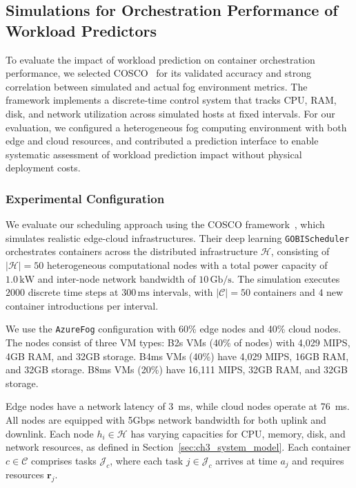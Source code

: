 \subsection{Simulations for Orchestration Performance of Workload Predictors}
\label{sec:ch3_simulations}


To evaluate the impact of workload prediction on container orchestration performance, we selected \ac{COSCO}~\cite{tuli2021cosco} for its validated accuracy and strong correlation between simulated and actual fog environment metrics. The framework implements a discrete-time control system that tracks \ac{CPU}, \ac{RAM}, disk, and network utilization across simulated hosts at fixed intervals. For our evaluation, we configured a heterogeneous fog computing environment with both edge and cloud resources, and contributed a prediction interface to enable systematic assessment of workload prediction impact without physical deployment costs.

\subsubsection{Experimental Configuration}

We evaluate our scheduling approach using the \ac{COSCO} framework~\cite{tuli2021cosco}, which simulates realistic edge-cloud infrastructures. Their deep learning \texttt{GOBIScheduler} orchestrates containers across the distributed infrastructure $\mathcal{H}$, consisting of $|\mathcal{H}| = 50$ heterogeneous computational nodes with a total power capacity of $1.0\,\text{kW}$ and inter-node network bandwidth of $10\,\text{Gb}/\text{s}$. The simulation executes $2000$ discrete time steps at $300\,\text{ms}$ intervals, with $|\mathcal{C}| = 50$ containers and $4$ new container introductions per interval.

 We use the \texttt{AzureFog} configuration with 60\% edge nodes and 40\% cloud nodes. The nodes consist of three \ac{VM} types: B2s \acp{VM} (40\% of nodes) with 4,029 \ac{MIPS}, 4GB \ac{RAM}, and 32GB storage. B4ms \acp{VM} (40\%) have 4,029 \ac{MIPS}, 16GB \ac{RAM}, and 32GB storage. B8ms \acp{VM} (20\%) have 16,111 \ac{MIPS}, 32GB \ac{RAM}, and 32GB storage.

Edge nodes have a network latency of \SI{3}{\milli\second}, while cloud nodes operate at \SI{76}{\milli\second}. All nodes are equipped with 5Gbps network bandwidth for both uplink and downlink. Each node $h_i \in \mathcal{H}$ has varying capacities for \ac{CPU}, memory, disk, and network resources, as defined in Section~\ref{sec:ch3_system_model}. Each container $c \in \mathcal{C}$ comprises tasks $\mathcal{J}_c$, where each task $j \in \mathcal{J}_c$ arrives at time $a_j$ and requires resources $\mathbf{r}_j$.

